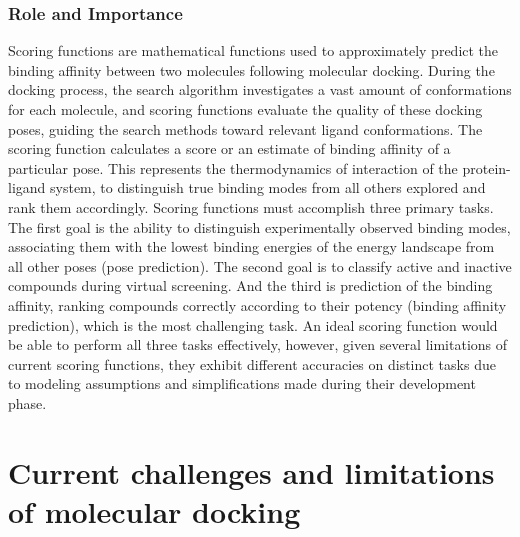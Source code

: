 \subsubsection{Role and Importance}
Scoring functions are mathematical functions\cite{CH1_20} used to approximately predict the binding affinity between two molecules following molecular docking. During the docking process, the search algorithm investigates a vast amount of conformations for each molecule, and scoring functions evaluate the quality of these docking poses, guiding the search methods toward relevant ligand conformations.
The scoring function calculates a score or an estimate of binding affinity of a particular pose. This  represents the thermodynamics of interaction of the protein-ligand system, to distinguish true binding modes from all others explored and rank them accordingly. Scoring functions must accomplish three primary tasks. The first goal is the ability to distinguish experimentally observed binding modes, associating them with the lowest binding energies of the energy landscape from all other poses (pose prediction). The second goal is to classify active and inactive compounds during virtual screening. And the third is prediction of the binding affinity, ranking compounds correctly according to their potency (binding affinity prediction), which is the most challenging task. An ideal scoring function would be able to perform all three tasks effectively, however, given several limitations of current scoring functions, they exhibit different accuracies on distinct tasks due to modeling assumptions and simplifications made during their development phase. 

\section{Current challenges and limitations of molecular docking}

